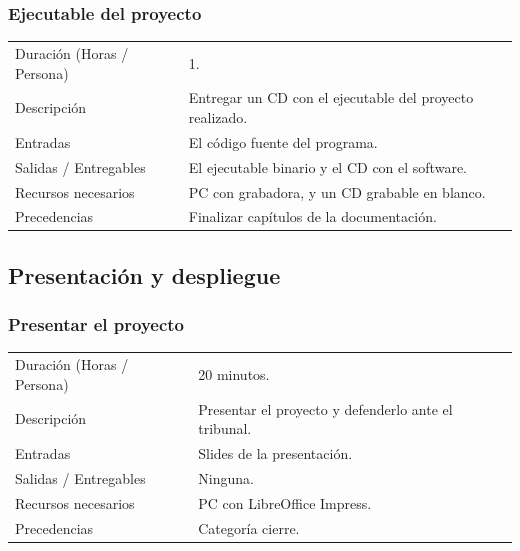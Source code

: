 \subsubsection{Ejecutable del proyecto}
\begin{table}[H]
    \begin{center}
        \begin{tabular}{l p{8cm}}
            Duraci\'{o}n (Horas / Persona)        & 1. \\ 
            Descripci\'{o}n                       & Entregar un CD con el ejecutable del proyecto realizado. \\
            Entradas                              & El c\'{o}digo fuente del programa. \\
            Salidas / Entregables                 & El ejecutable binario y el CD con el software. \\
            Recursos necesarios                   & PC con grabadora, y un CD grabable en blanco. \\
            Precedencias                          & Finalizar cap\'{i}tulos de la documentaci\'{o}n. \\
        \end{tabular}
    \end{center}
    
\end{table}

\subsection{Presentaci\'{o}n y despliegue}
\subsubsection{Presentar el proyecto}
\begin{table}[H]
    \begin{center}
        \begin{tabular}{l p{8cm}}
            Duraci\'{o}n (Horas / Persona)        & 20 minutos. \\ 
            Descripci\'{o}n                       & Presentar el proyecto y defenderlo ante el tribunal. \\
            Entradas                              & Slides de la presentaci\'{o}n.\\
            Salidas / Entregables                 & Ninguna. \\
            Recursos necesarios                   & PC con LibreOffice Impress. \\
            Precedencias                          & Categor\'{i}a cierre. \\
        \end{tabular}
    \end{center}
    
\end{table}


